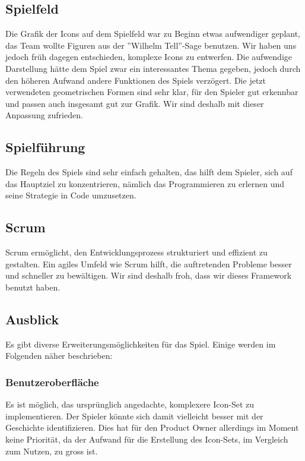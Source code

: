 \documentclass[11pt,a4paper,titlepage]{article}
\begin{document}
\subsection{Spielfeld}

Die Grafik der Icons auf dem Spielfeld war zu Beginn etwas aufwendiger geplant, das Team wollte Figuren aus der ''Wilhelm Tell''-Sage benutzen. Wir haben uns jedoch früh dagegen entschieden, komplexe Icons zu entwerfen. Die aufwendige Darstellung hätte dem Spiel zwar ein interessantes Thema gegeben, jedoch durch den höheren Aufwand andere Funktionen des Spiels verzögert. Die jetzt verwendeten geometrischen Formen sind sehr klar, für den Spieler gut erkennbar und passen auch insgesamt gut zur Grafik. Wir sind deshalb mit dieser Anpassung zufrieden.

\subsection{Spielführung}

Die Regeln des Spiels sind sehr einfach gehalten, das hilft dem Spieler, sich auf das Hauptziel zu konzentrieren, nämlich das Programmieren zu erlernen und seine Strategie in Code umzusetzen.

\subsection{Scrum}
Scrum ermöglicht, den Entwicklungsprozess strukturiert und effizient zu gestalten. Ein agiles Umfeld wie Scrum hilft, die auftretenden Probleme besser und schneller zu bewältigen. Wir sind deshalb froh, dass wir dieses Framework benutzt haben.

\newpage
\subsection{Ausblick}

Es gibt diverse Erweiterungsmöglichkeiten für das Spiel. Einige werden im Folgenden näher beschrieben:

\subsubsection{Benutzeroberfläche}
Es ist möglich, das ursprünglich angedachte, komplexere Icon-Set zu implementieren. Der Spieler könnte sich damit vielleicht besser mit der Geschichte identifizieren. Dies hat für den Product Owner allerdings im Moment keine Priorität, da der Aufwand für die Erstellung des Icon-Sets, im Vergleich zum Nutzen, zu gross ist.
\end{document}
